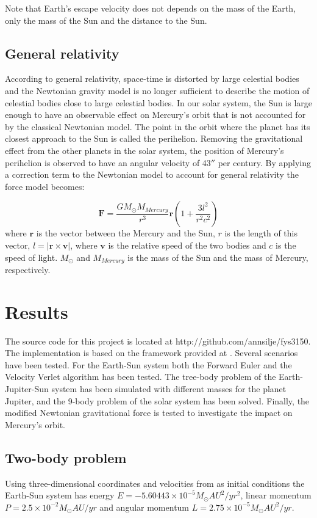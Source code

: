 \documentclass{article}
\begin{document}
Note that Earth's escape velocity does not depends on the mass of the Earth, only the mass of the Sun and the distance to the Sun.


\subsection{General relativity}
\label{sec:gr}
According to general relativity, space-time is distorted by large celestial bodies and the Newtonian gravity model is no longer sufficient to describe the motion of celestial bodies close to large celestial bodies. In our solar system, the Sun is large enough to have an observable effect on Mercury's orbit that is not accounted for by the classical Newtonian model. The point in the orbit where the planet has its closest approach to the Sun is called the perihelion. Removing the gravitational effect from the other planets in the solar system, the position of Mercury's perihelion is observed to have an angular velocity of 43$''$ per century. By applying a correction term to the Newtonian model to account for general relativity the force model becomes:

\begin{equation}
\bm{F} = \frac{GM_{\odot}M_{Mercury}}{r^3}\bm{r}\left(1 + \frac{3l^2}{r^2c^2}\right) 
\label{eq:grav_gr}
\end{equation}
where $\bm{r}$ is the vector between the Mercury and the Sun, $r$ is the length of this vector, $l = |\bm{r}\times \bm{v}|$, where $\bm{v}$ is the relative speed of the two bodies and $c$ is the speed of light. $M_{\odot}$ and $M_{Mercury}$ is the mass of the Sun and the mass of Mercury, respectively.

\section{Results}
\label{sec:results}
The source code for this project is located at http://github.com/annsilje/fys3150. The implementation is based on the framework provided at \cite{framework}. Several scenarios have been tested. For the Earth-Sun system both the Forward Euler and the Velocity Verlet algorithm has been tested. The tree-body problem of the Earth-Jupiter-Sun system has been simulated with different masses for the planet Jupiter, and the 9-body problem of the solar system has been solved. Finally, the modified Newtonian gravitational force is tested to investigate the impact on Mercury's orbit. 


\subsection{Two-body problem}
Using three-dimensional coordinates and velocities from \cite{eph} as initial conditions the Earth-Sun system has energy $E=-5.60443 \times 10^{-5} M_{\odot}AU^2/yr^2$, linear momentum $P=2.5\times 10^{-2} M_{\odot}AU/yr$ and angular momentum $L=2.75 \times 10^{-5} M_{\odot}AU^2/yr$. 
\end{document}
